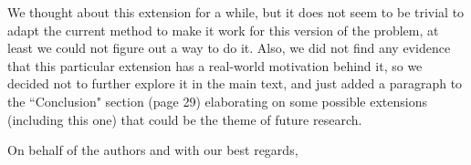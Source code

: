 \begin{letter}{}
		We thought about this extension for a while, but it does not seem to be trivial to adapt the current method to make it work for this version of the problem, at least we could not figure out a way to do it. Also, we did not find any evidence that this particular extension has a real-world motivation behind it, so we decided not to further explore it in the main text, and just added a paragraph to the ``Conclusion" section (page 29) elaborating on some possible extensions (including this one) that could be the theme of future research.
		
		
		\closing{On behalf of the authors and with our best regards,}
			\end{letter}
